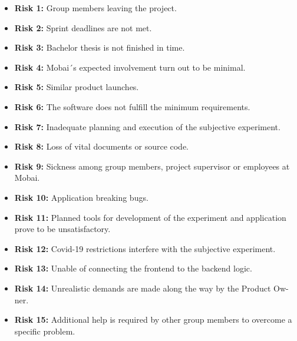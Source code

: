 \begin{itemize}
    \item \textbf{Risk 1:} Group members leaving the project.
    \item \textbf{Risk 2:} Sprint deadlines are not met.
    \item \textbf{Risk 3:} Bachelor thesis is not finished in time.
    \item \textbf{Risk 4:} Mobai´s expected involvement turn out to be minimal. 
    \item \textbf{Risk 5:} Similar product launches.
    \item \textbf{Risk 6:} The software does not fulfill the minimum requirements.
    \item \textbf{Risk 7:} Inadequate planning and execution of the subjective experiment.
    \item \textbf{Risk 8:} Loss of vital documents or source code.
    \item \textbf{Risk 9:} Sickness among group members, project supervisor or employees at Mobai.
    \item \textbf{Risk 10:} Application breaking bugs.
    \item \textbf{Risk 11:} Planned tools for development of the experiment and application prove to be unsatisfactory. 
    \item \textbf{Risk 12:} Covid-19 restrictions interfere with the subjective experiment. 
    \item \textbf{Risk 13:} Unable of connecting the frontend to the backend logic. 
    \item \textbf{Risk 14:} Unrealistic demands are made along the way by the Product Ow-ner. 
    \item \textbf{Risk 15:} Additional help is required by other group members to overcome a specific problem.
\end{itemize}

